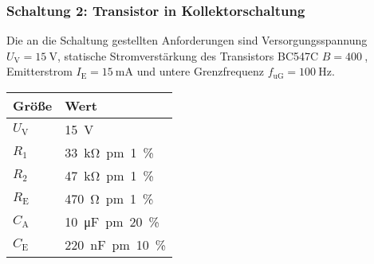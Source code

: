 \subsubsection*{Schaltung 2: Transistor in Kollektorschaltung}
%
Die an die Schaltung gestellten Anforderungen sind Versorgungsspannung $U_{\text{V}} = \SI{15}{\volt}$, statische Stromverstärkung des Transistors BC547C $B = \SI{400}{}$, Emitterstrom $I_{\text{E}} = \SI{15}{\milli\ampere}$ und untere Grenzfrequenz $f_{\text{uG}} = \SI{100}{\hertz}$.
%
\par
%
\minipage{\linewidth}
    \begin{center}
        \captionsetup{type=table}
        \begin{adjustbox}{max width=\linewidth, keepaspectratio}
            \begin{tabular}{ll}
            \toprule
            Größe & Wert \\
            \midrule
            $U_{\text{V}}$ & \SI{15}{\volt} \\
            $R_1$ & \SI{33}{\kilo\ohm \pm 1 \percent} \\
            $R_2$ & \SI{47}{\kilo\ohm \pm 1 \percent} \\
            $R_{\text{E}}$ & \SI{470}{\ohm \pm 1 \percent} \\
            $C_{\text{A}}$ & \SI{10}{\micro\farad \pm 20 \percent} \\
            $C_{\text{E}}$ & \SI{220}{\nano\farad \pm 10 \percent} \\
            \bottomrule
            \end{tabular}
        \end{adjustbox}
        \label{tab:DimensionierungKollektorschaltung}
    \end{center}
\endminipage
%
